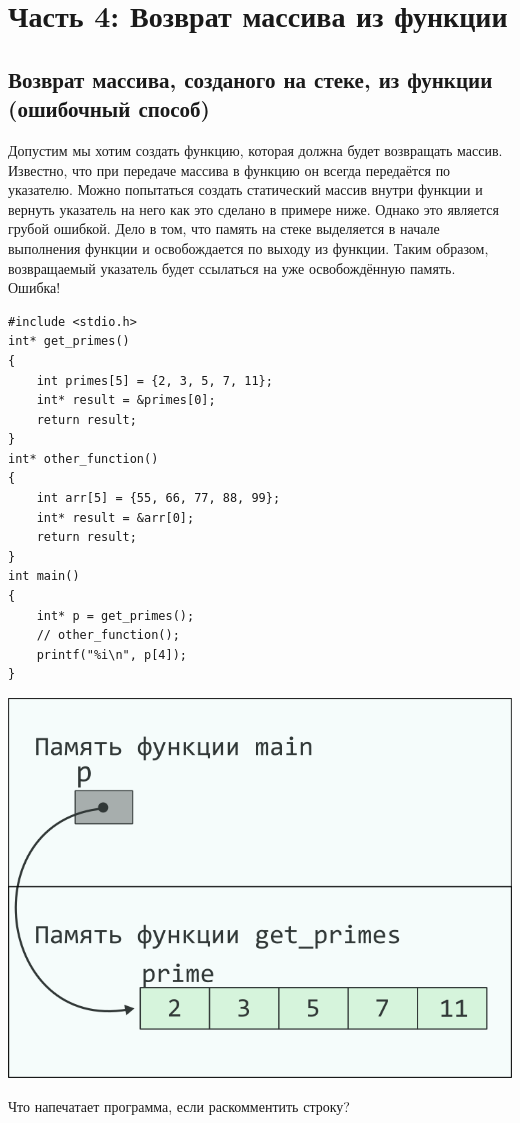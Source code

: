 \documentclass{article}
\begin{document}
\newpage
\section*{Часть 4: Возврат массива из функции}
\subsection*{Возврат массива, созданого на стеке, из функции (ошибочный способ)}
Допустим мы хотим создать функцию, которая должна будет возвращать массив.
Известно, что при передаче массива в функцию он всегда передаётся по указателю.
Можно попытаться создать статический массив внутри функции и вернуть указатель на него как
это сделано в примере ниже.
Однако это является грубой ошибкой. Дело в том, что память на стеке
выделяется в начале выполнения функции и освобождается по выходу из функции.
Таким образом, возвращаемый указатель будет ссылаться на уже освобождённую память. Ошибка!
\begin{multicols}{2}
\begin{lstlisting}
#include <stdio.h>
int* get_primes() 
{
    int primes[5] = {2, 3, 5, 7, 11};
    int* result = &primes[0];
    return result;
}
int* other_function() 
{
    int arr[5] = {55, 66, 77, 88, 99};
    int* result = &arr[0];
    return result;
}
int main() 
{
    int* p = get_primes();
    // other_function();
    printf("%i\n", p[4]);
}
\end{lstlisting}
\columnbreak
\begin{center}
\includegraphics[scale=1]{../images/pointer_schemes/function_return_stack_array.png}
\end{center}
\end{multicols}
Что напечатает программа, если раскомментить строку?
\end{document}
